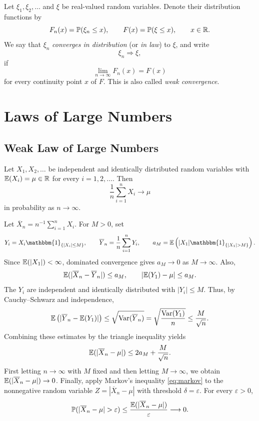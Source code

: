 \begin{definitionbox}
    Let $\xi_1,\xi_2,\ldots$ and $\xi$ be real-valued random variables.
    Denote their distribution functions by
    $$F_n(x)=\mathbb{P}(\xi_n\leq x),\qquad
    F(x)=\mathbb{P}(\xi\leq x),\qquad x\in\mathbb{R}.$$
    We say that $\xi_n$ \emph{converges in distribution} (or
    \emph{in law}) to $\xi$, and write
    $$\xi_n\Rightarrow\xi,$$
    if
    $$\lim_{n\to\infty}F_n(x)=F(x)$$
    for every continuity point $x$ of $F$.
    This is also called \emph{weak convergence}.
\end{definitionbox}

\section{Laws of Large Numbers}

\subsection{Weak Law of Large Numbers}

\begin{theorembox}
    Let $X_1, X_2, \ldots$ be independent and identically distributed random variables with $\mathbb{E}(X_i) = \mu \in \mathbb{R}$ for every $i = 1, 2, \ldots$. Then
    $$\frac{1}{n}\sum_{i=1}^{n} X_i \longrightarrow \mu$$
    in probability as $n \to \infty$.
\end{theorembox}
\begin{proofbox}
    Let $\overline{X}_n=n^{-1}\sum_{i=1}^{n}X_i$. For $M>0$, set
    $$Y_i=X_i\mathbbm{1}_{\{|X_i|\leq M\}},\qquad
    \overline{Y}_n=\frac{1}{n}\sum_{i=1}^{n}Y_i,\qquad
    a_M=\EE\left(|X_1|\mathbbm{1}_{\{|X_1|>M\}}\right).$$
    Since $\mathbb{E}(|X_1|)<\infty$, dominated convergence gives
    $a_M\to0$ as $M\to\infty$. Also,
    $$\mathbb{E}(|\overline{X}_n-\overline{Y}_n|)\leq a_M,
    \qquad |\mathbb{E}(Y_1)-\mu|\leq a_M.$$
    The $Y_i$ are independent and identically distributed with
    $|Y_i|\leq M$. Thus, by Cauchy--Schwarz and independence,
    $$\mathbb{E}\left(|\overline{Y}_n-\mathbb{E}(Y_1)|\right)
    \leq \sqrt{\operatorname{\mathrm{Var}}(\overline{Y}_n)}
    =\sqrt{\frac{\operatorname{\mathrm{Var}}(Y_1)}{n}}\leq\frac{M}{\sqrt{n}}.$$
    Combining these estimates by the triangle inequality yields
    $$\mathbb{E}(|\overline{X}_n-\mu|)\leq 2a_M+\frac{M}{\sqrt{n}}.$$
    First letting $n\to\infty$ with $M$ fixed and then letting
    $M\to\infty$, we obtain $\mathbb{E}(|\overline{X}_n-\mu|)\to0$.
    Finally, apply Markov's inequality \eqref{eq:markov} to the nonnegative random
    variable $Z=|\overline{X}_n-\mu|$ with threshold
    $\delta=\varepsilon$. For every $\varepsilon>0$,
    $$\PP(|\overline{X}_n-\mu|>\varepsilon)
    \leq\frac{\EE(|\overline{X}_n-\mu|)}{\varepsilon}
    \longrightarrow0.$$
\end{proofbox}

